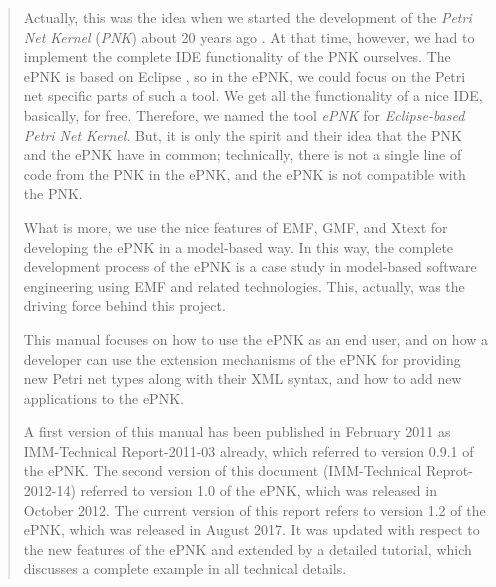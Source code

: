 \begin{quote}
Actually, this was the idea when we started the development of the
\emph{Petri Net Kernel} (\emph{PNK}) about 20 years ago
\cite{KiDe96,Kin97d,KiWe01c}. At that time, however, we had to implement
the complete IDE functionality of the PNK ourselves. The ePNK is based
on Eclipse \cite{Eclipse-WWW}, so in the ePNK, we could focus on the
Petri net specific parts of such a tool. We get all the functionality
of a nice IDE, basically, for free. Therefore, we named the tool
\emph{ePNK} for \emph{Eclipse-based Petri Net Kernel}. But, it is only
the spirit and their idea that the PNK and the ePNK have in common;
technically, there is not a single line of code from the PNK in the ePNK,
and the ePNK is not compatible with the PNK.

What is more, we use the nice features of EMF, GMF, and Xtext
for developing the ePNK in a model-based way. In this way, the
complete development process of the ePNK is a case study in model-based
software engineering using EMF and related technologies. This, actually,
was the driving force behind this project.

This manual focuses on how
to use the ePNK as an end user, and on how a developer can use the
extension mechanisms of the ePNK for providing new Petri net types along
with their XML syntax, and how to add new applications to the ePNK.

A first version of this manual has been published in February 2011 as
IMM-Technical Report-2011-03 already, which referred to version 0.9.1 of the
ePNK. The second version of this document (IMM-Technical Reprot-2012-14)
referred to version 1.0 of the ePNK, which was released in October 2012. The
current version of this report refers to version 1.2 of the ePNK, which
was released in August 2017. It was updated with respect to the new features
of the ePNK and extended by a detailed tutorial, which discusses a
complete example in all technical details.
\end{quote}
